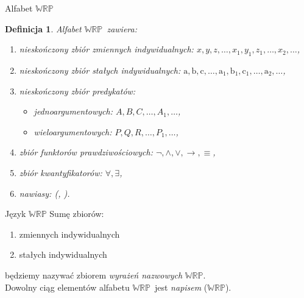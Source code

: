\documentclass{beamer}
\newtheorem{definicja}{Definicja}
\newcommand {\WRP} {\ensuremath{\mathbb{WRP}}}
\begin{document}
\begin{frame}{Alfabet \WRP}
%
\begin{definicja}
\label{alfabet (WRP)}
Alfabet \WRP~zawiera:
%
\begin{enumerate}
\item nieskończony zbiór zmiennych indywidualnych: $x, y, z, \dots, x_{1}, y_{1}, z_{1}, \dots, x_{2}, \dots$,
%
\item nieskończony zbiór stałych indywidualnych: $\textrm{a}, \textrm{b}, \textrm{c}, \dots, \textrm{a}_{1}, \textrm{b}_{1}, \textrm{c}_{1}, \dots, \textrm{a}_{2}, \dots$,
%
\item nieskończony zbiór predykatów:
\begin{itemize}
\item jednoargumentowych: $A, B, C, \dots, A_{1}, \dots$,
\item wieloargumentowych: $P, Q, R, \dots, P_{1}, \dots$,
\end{itemize}
%
\item zbiór funktorów prawdziwościowych: $\neg, \land, \lor, \to, \equiv$,
%
\item zbiór kwantyfikatorów: $\forall, \exists$,
%
\item nawiasy: (, ).
\end{enumerate}
\end{definicja}
\end{frame}

\begin{frame}{Język \WRP}
%
Sumę zbiorów:
\begin{enumerate}
\item zmiennych indywidualnych
\item stałych indywidualnych
\end{enumerate}
będziemy nazywać zbiorem \emph{wyrażeń nazwowych} \WRP.\\
%
Dowolny ciąg elementów alfabetu \WRP~jest \emph{napisem} (\WRP).
\end{frame}
\end{document}
